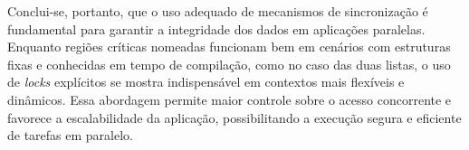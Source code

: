 \documentclass[a4paper, 12pt]{article}
\begin{document}
	\hspace{0.7cm}Conclui-se, portanto, que o uso adequado de mecanismos de sincronização é fundamental para garantir a integridade dos dados em aplicações paralelas. Enquanto regiões críticas nomeadas funcionam bem em cenários com estruturas fixas e conhecidas em tempo de compilação, como no caso das duas listas, o uso de \textit{locks} explícitos se mostra indispensável em contextos mais flexíveis e dinâmicos. Essa abordagem permite maior controle sobre o acesso concorrente e favorece a escalabilidade da aplicação, possibilitando a execução segura e eficiente de tarefas em paralelo.
	

	
	
	
	
\end{document}
